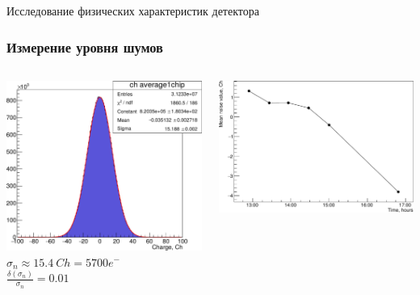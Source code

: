 \documentclass[14pt]{beamer}
\begin{document}
\begin{frame}[c]
\centering \large {Исследование физических характеристик детектора}
\end{frame}

\begin{frame}[c]
\frametitle{Измерение уровня шумов}
\vspace{10pt}
\begin{columns}
	\begin{minipage}[t][1\textheight]{\linewidth}
		\includegraphics[width=1\linewidth]{Noise_stat.pdf}
		\vspace{15pt}
	 	\\ \centering \small{$ \sigma_{n} \approx 15.4~Ch = 5700 e^{-}$}
	 	\vspace{10pt}
	 	\\ \centering \small{$ \displaystyle \frac{\delta(\sigma_{n})}{\sigma_{n}} = 0.01 $}
	\end{minipage}%
	\begin{minipage}[t][1\textheight]{\linewidth}
	\begin{center}
	\vspace{-10pt}
	\includegraphics[width=0.7\linewidth]{Mean_time_drift.pdf}

\end{center}
\end{minipage}
\end{columns}
\end{frame}
\end{document}
